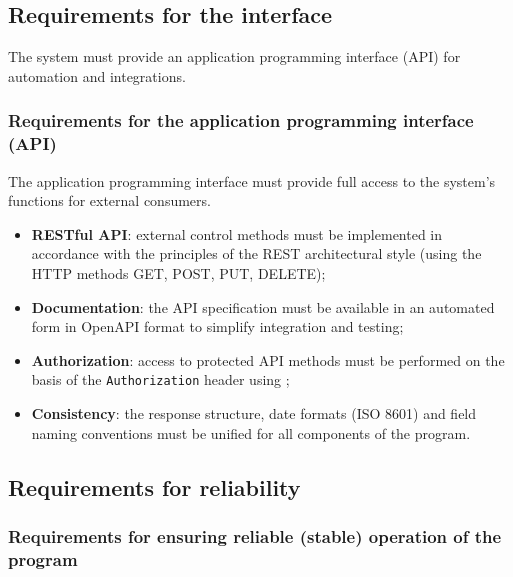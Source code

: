 \documentclass[12pt,a4paper]{extarticle}
\begin{document}
\subsection{Requirements for the interface}
\label{sec:interface_reqs}

\begin{hseExample}
The system must provide an application programming interface (API) for automation and integrations.
\end{hseExample}

\subsubsection{Requirements for the application programming interface (API)}

\begin{hseExample}
The application programming interface must provide full access to the system's functions for external consumers.
\begin{itemize}[nosep, leftmargin=1.25cm]
    \item \textbf{RESTful API}: external control methods must be implemented in accordance with the principles of the REST architectural style (using the HTTP methods GET, POST, PUT, DELETE);
    \item \textbf{Documentation}: the API specification must be available in an automated form in OpenAPI format to simplify integration and testing;
    \item \textbf{Authorization}: access to protected API methods must be performed on the basis of the \texttt{Authorization} header using ;
    \item \textbf{Consistency}: the response structure, date formats (ISO 8601) and field naming conventions must be unified for all components of the program.
\end{itemize}
\end{hseExample}

\subsection{Requirements for reliability}

\subsubsection{Requirements for ensuring reliable (stable) operation of the program}
\end{document}
